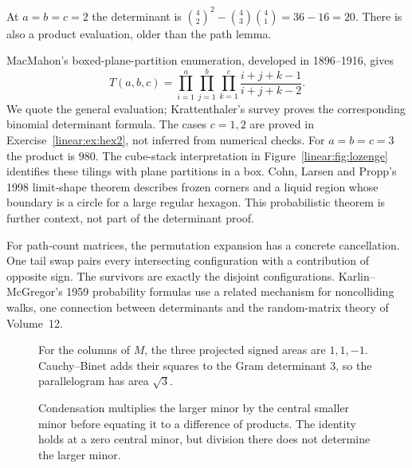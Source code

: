 At $a=b=c=2$ the determinant is $\binom42^2-\binom43\binom41=36-16=20$. There is also a product evaluation, older than the path lemma.

\begin{remark}
MacMahon's boxed-plane-partition enumeration, developed in 1896--1916, gives
\[T(a,b,c)=\prod_{i=1}^a\prod_{j=1}^b\prod_{k=1}^c\frac{i+j+k-1}{i+j+k-2}.
\]
We quote the general evaluation; Krattenthaler's survey proves the corresponding binomial determinant formula. The cases $c=1,2$ are proved in Exercise~\ref{linear:ex:hex2}, not inferred from numerical checks. For $a=b=c=3$ the product is $980$. The cube-stack interpretation in Figure~\ref{linear:fig:lozenge} identifies these tilings with plane partitions in a box. Cohn, Larsen and Propp's 1998 limit-shape theorem describes frozen corners and a liquid region whose boundary is a circle for a large regular hexagon. This probabilistic theorem is further context, not part of the determinant proof.
\end{remark}

\begin{beauty}
For path-count matrices, the permutation expansion has a concrete cancellation. One tail swap pairs every intersecting configuration with a contribution of opposite sign. The survivors are exactly the disjoint configurations. Karlin--McGregor's 1959 probability formulas use a related mechanism for noncolliding walks, one connection between determinants and the random-matrix theory of Volume~12.
\end{beauty}

\begin{figure}[ht]
\centering{}
\caption{For the columns of $M$, the three projected signed areas are $1,1,-1$. Cauchy--Binet adds their squares to the Gram determinant $3$, so the parallelogram has area $\sqrt3$.}
\label{fig:v8appBminors}
\end{figure}
\begin{figure}[ht]
\centering{}
\caption{Condensation multiplies the larger minor by the central smaller minor before equating it to a difference of products. The identity holds at a zero central minor, but division there does not determine the larger minor.}
\label{fig:v8appBcondense}
\end{figure}
